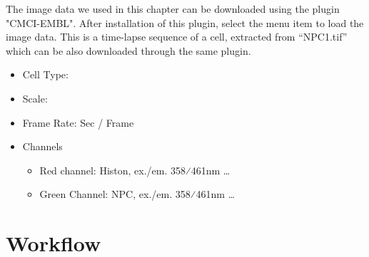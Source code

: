 

The image data we used in this chapter can be downloaded using the plugin "CMCI-EMBL". After installation of this plugin, select the menu item  to load the image data. This is a time-lapse sequence of a cell, extracted from ``NPC1.tif'' which can be also downloaded through the same plugin. 

\begin{itemize}
\item Cell Type: 
\item Scale: 
\item Frame Rate: Sec / Frame
\item Channels
\begin{itemize}
    \item Red channel: Histon, ex./em. 358⁄461nm \dots
	\item Green Channel: NPC,  ex./em. 358⁄461nm \dots
\end{itemize}
\end{itemize}

\section{Workflow}





